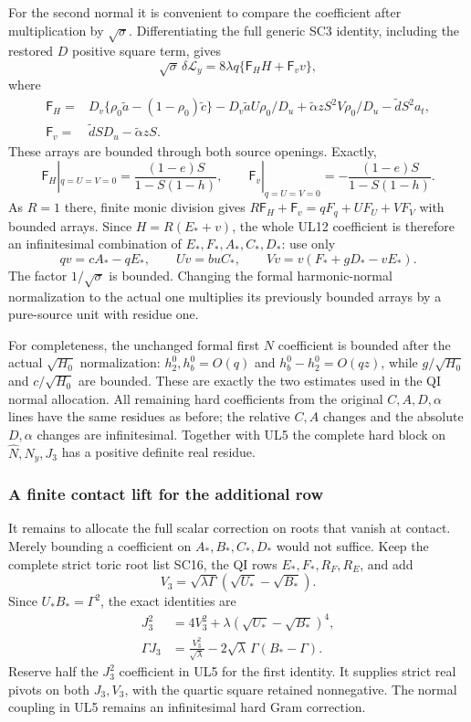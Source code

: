 For the second normal it is convenient to compare the coefficient
after multiplication by $\sqrt\sigma$. Differentiating the full
generic SC3 identity, including the restored $D$ positive square term, gives
\[
 \sqrt\sigma\,\delta\mathcal L_y
       =8\lambda q\{\mathsf F_HH+\mathsf F_vv\},                 \tag{UL12}
\]
where
\[
\begin{split}
\mathsf F_H={}&D_v\{\rho_0\widetilde a
                    -(1-\rho_0)\widetilde c\}
 -D_v\widetilde aU\rho_0/D_u
 +\widetilde\alpha zS^2V\rho_0/D_u
 -\widetilde dS^2a_t,\\
\mathsf F_v={}&\widetilde dSD_u-\widetilde\alpha zS.
\end{split}
\]
These arrays are bounded through both source openings. Exactly,
\[
 \mathsf F_H|_{q=U=V=0}
       =\frac{(1-e)S}{1-S(1-h)},\qquad
 \mathsf F_v|_{q=U=V=0}
       =-\frac{(1-e)S}{1-S(1-h)}.                              \tag{UL13}
\]
As $R=1$ there, finite monic division gives
$R\mathsf F_H+\mathsf F_v=qF_q+UF_U+VF_V$ with bounded
arrays. Since $H=R(E_*+v)$, the whole UL12 coefficient is
therefore an infinitesimal combination of $E_*,F_*,A_*,C_*,D_*$:
use only
\[
 qv=cA_*-qE_*,\qquad Uv=buC_*,\qquad
 Vv=v(F_*+gD_*-vE_*).                                         \tag{UL14}
\]
The factor $1/\sqrt\sigma$ is bounded.
Changing the formal harmonic-normal normalization to the actual
one multiplies its previously bounded arrays by a pure-source
unit with residue one.

For completeness, the unchanged formal first $N$ coefficient is
bounded after the actual $\sqrt{H_0}$ normalization:
$h_2^0,h_b^0=O(q)$ and $h_b^0-h_2^0=O(qz)$, while
$g/\sqrt{H_0}$ and $c/\sqrt{H_0}$ are bounded. These are exactly
the two estimates used in the QI normal allocation.
All remaining hard coefficients from the original $C,A,D,\alpha$
lines have the same residues as before; the relative $C,A$
changes and the absolute $D,\alpha$ changes are infinitesimal.
Together with UL5 the complete hard block on
$\widehat N,N_y,J_3$ has a positive definite real residue.

\subsubsection*{A finite contact lift for the additional row}

It remains to allocate the full scalar correction on roots that
vanish at contact. Merely bounding a coefficient on $A_*,B_*,C_*,D_*$
would not suffice. Keep the complete strict toric root list SC16,
the QI rows $E_*,F_*,R_F,R_E$, and add
\[
 V_3=\sqrt{\lambda\Gamma}(\sqrt{U_*}-\sqrt{B_*}).
\]
Since $U_*B_*=\Gamma^2$, the exact identities are
\[
\begin{split}
 J_3^2&=4V_3^2+\lambda(\sqrt{U_*}-\sqrt{B_*})^4,\\
 \Gamma J_3&=\frac{V_3^2}{\sqrt\lambda}
                      -2\sqrt\lambda\,\Gamma(B_*-\Gamma).
\end{split}                                                     \tag{UL15}
\]
Reserve half the $J_3^2$ coefficient in UL5 for the first
identity. It supplies strict real pivots on both $J_3,V_3$,
with the quartic square retained nonnegative. The normal
coupling in UL5 remains an infinitesimal hard Gram correction.

